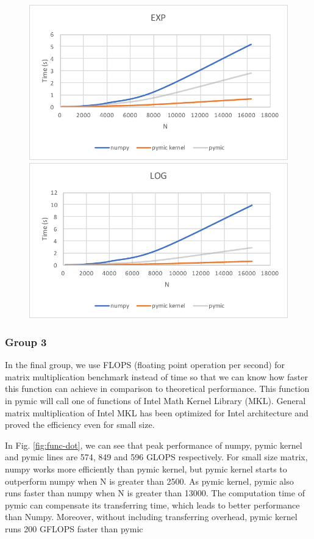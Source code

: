 \begin{figure}[]
\includegraphics[scale=0.5]{img/group2/exp.pdf}
\includegraphics[scale=0.5]{img/group2/log.pdf}
\end{figure}

\subsubsection{Group 3}
In the final group, we use FLOPS (floating point operation per second) for matrix multiplication benchmark instead of time so that we can know how faster this function can achieve in comparison to theoretical performance. This function in pymic will call one of functions of Intel Math Kernel Library (MKL). General matrix multiplication of Intel MKL has been optimized for Intel architecture and proved the efficiency even for small size. 

In Fig. \ref{fig:func-dot}, we can see that peak performance of numpy, pymic kernel and pymic lines are 574, 849 and 596 GLOPS respectively. For small size matrix, numpy works more efficiently than pymic kernel, but pymic kernel starts to outperform numpy when N is greater than 2500. As pymic kernel, pymic also runs faster than numpy when N is greater than 13000. The computation time of pymic can compensate its transferring time, which leads to better performance than Numpy. Moreover, without including transferring overhead, pymic kernel runs 200 GFLOPS faster than pymic

